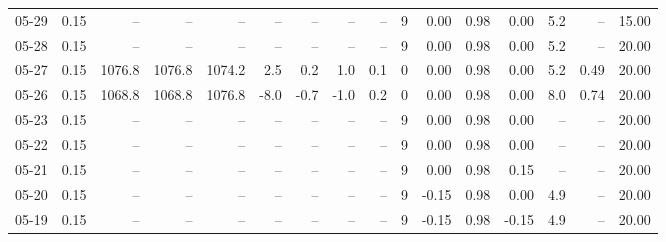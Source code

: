 \begin{threeparttable}
{\begin{tabular}{lrrrrrrrrrrrrrrr}
  05-29 &     0.15 &     -- &     -- &     -- &         -- &             -- &                       -- &                  -- &              9 &       0.00 &      0.98 &           0.00 &              5.2 &              -- &                  15.00 \\
  05-28 &     0.15 &     -- &     -- &     -- &         -- &             -- &                       -- &                  -- &              9 &       0.00 &      0.98 &           0.00 &              5.2 &              -- &                  20.00 \\
  05-27 &     0.15 & 1076.8 & 1076.8 & 1074.2 &        2.5 &            0.2 &                      1.0 &                 0.1 &              0 &       0.00 &      0.98 &           0.00 &              5.2 &            0.49 &                  20.00 \\
  05-26 &     0.15 & 1068.8 & 1068.8 & 1076.8 &       -8.0 &           -0.7 &                     -1.0 &                 0.2 &              0 &       0.00 &      0.98 &           0.00 &              8.0 &            0.74 &                  20.00 \\
  05-23 &     0.15 &     -- &     -- &     -- &         -- &             -- &                       -- &                  -- &              9 &       0.00 &      0.98 &           0.00 &               -- &              -- &                  20.00 \\
  05-22 &     0.15 &     -- &     -- &     -- &         -- &             -- &                       -- &                  -- &              9 &       0.00 &      0.98 &           0.00 &               -- &              -- &                  20.00 \\
  05-21 &     0.15 &     -- &     -- &     -- &         -- &             -- &                       -- &                  -- &              9 &       0.00 &      0.98 &           0.15 &               -- &              -- &                  20.00 \\
  05-20 &     0.15 &     -- &     -- &     -- &         -- &             -- &                       -- &                  -- &              9 &      -0.15 &      0.98 &           0.00 &              4.9 &              -- &                  20.00 \\
  05-19 &     0.15 &     -- &     -- &     -- &         -- &             -- &                       -- &                  -- &              9 &      -0.15 &      0.98 &          -0.15 &              4.9 &              -- &                  20.00 \\

\end{tabular}}
\end{threeparttable}
